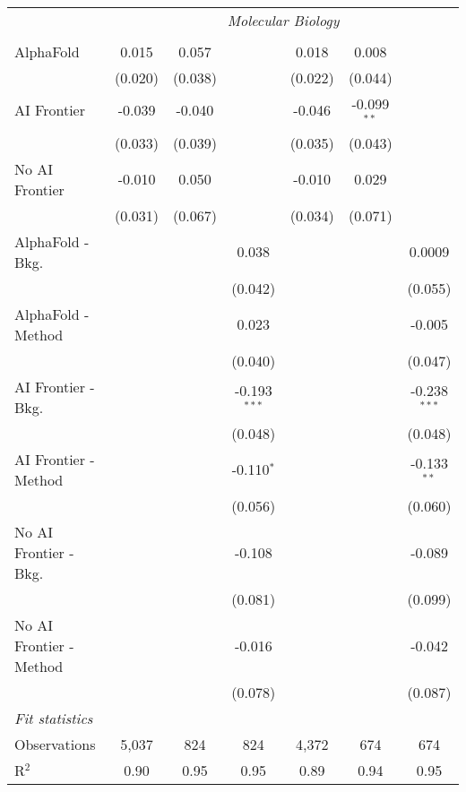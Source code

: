 \begin{tabular}{lcccccc}
 & \multicolumn{6}{c}{\textit{Molecular Biology}} \\ \\
   AlphaFold               & 0.015   & 0.057   &                & 0.018   & 0.008         &   \\   
                           & (0.020) & (0.038) &                & (0.022) & (0.044)       &   \\   
   AI Frontier             & -0.039  & -0.040  &                & -0.046  & -0.099$^{**}$ &   \\   
                           & (0.033) & (0.039) &                & (0.035) & (0.043)       &   \\   
   No AI Frontier          & -0.010  & 0.050   &                & -0.010  & 0.029         &   \\   
                           & (0.031) & (0.067) &                & (0.034) & (0.071)       &   \\   
   AlphaFold - Bkg.        &         &         & 0.038          &         &               & 0.0009\\   
                           &         &         & (0.042)        &         &               & (0.055)\\   
   AlphaFold - Method      &         &         & 0.023          &         &               & -0.005\\   
                           &         &         & (0.040)        &         &               & (0.047)\\   
   AI Frontier - Bkg.      &         &         & -0.193$^{***}$ &         &               & -0.238$^{***}$\\   
                           &         &         & (0.048)        &         &               & (0.048)\\   
   AI Frontier - Method    &         &         & -0.110$^{*}$   &         &               & -0.133$^{**}$\\   
                           &         &         & (0.056)        &         &               & (0.060)\\   
   No AI Frontier - Bkg.   &         &         & -0.108         &         &               & -0.089\\   
                           &         &         & (0.081)        &         &               & (0.099)\\   
   No AI Frontier - Method &         &         & -0.016         &         &               & -0.042\\   
                           &         &         & (0.078)        &         &               & (0.087)\\   
   \midrule
   \emph{Fit statistics}\\
   Observations            & 5,037   & 824     & 824            & 4,372   & 674           & 674\\  
   R$^2$                   & 0.90    & 0.95    & 0.95           & 0.89    & 0.94          & 0.95\\  
   

\end{tabular}
